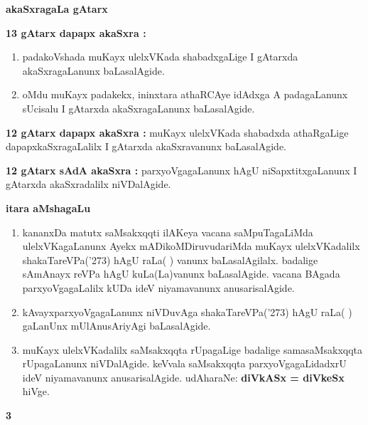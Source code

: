 \medskip

\begin{center}
{\large\bf akaSxragaLa gAtarx}
\end{center}
{\bf 13 gAtarx dapapx akaSxra :} 
\begin{enumerate}
\item padakoVshada muKayx ulelxVKada shabadxgaLige I gAtarxda akaSxragaLanunx baLasalAgide.
\item oMdu muKayx padakekx, ininxtara athaRCAye idAdxga A padagaLanunx sUcisalu I gAtarxda akaSxragaLanunx baLasalAgide.
\end{enumerate}

\noindent
{\bf 12 gAtarx dapapx akaSxra :} muKayx ulelxVKada shabadxda athaRgaLige dapapxkaSxragaLalilx I gAtarxda akaSxravanunx baLasalAgide.

\medskip

\noindent
{\bf 12 gAtarx sAdA akaSxra :} parxyoVgagaLanunx hAgU niSapxtitxgaLanunx I gAtarxda akaSxradalilx niVDalAgide.

\bigskip

\begin{center}
{\large\bf itara aMshagaLu}
\end{center}
\begin{enumerate}
\item kananxDa matutx saMsakxqqti ilAKeya vacana saMpuTagaLiMda ulelxVKagaLanunx Ayekx mADikoMDiruvudariMda muKayx ulelxVKadalilx shakaTareVPa(\char'273) hAgU raLa( ) vanunx baLasalAgilalx. badalige sAmAnayx reVPa hAgU kuLa(La)vanunx baLasalAgide. vacana BAgada parxyoVgagaLalilx kUDa ideV niyamavanunx anusarisalAgide.

\item kAvayxparxyoVgagaLanunx niVDuvAga shakaTareVPa(\char'273) hAgU raLa( ) gaLanUnx mUlAnusAriyAgi baLasalAgide.

\item muKayx ulelxVKadalilx saMsakxqqta rUpagaLige badalige samasaMsakxqqta rUpagaLanunx niVDalAgide. keVvala saMsakxqqta parxyoVgagaLidadxrU ideV niyamavanunx anusarisalAgide. udAharaNe: \textbf{diVkASx = diVkeSx} hiVge. 
\end{enumerate}

\newpage

\begin{center}
{\large\bfseries 3}
\end{center}
\smallskip

